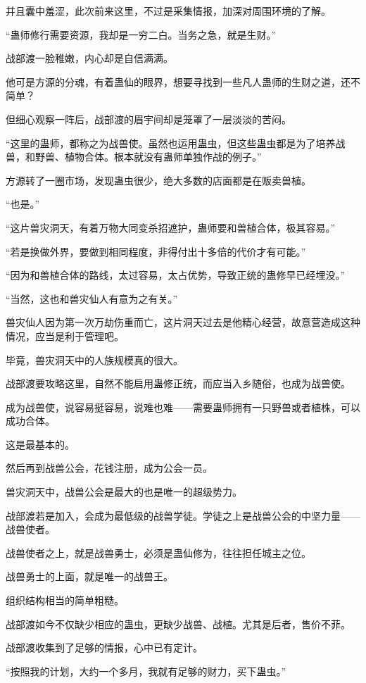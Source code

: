 \begin{this_body}
并且囊中羞涩，此次前来这里，不过是采集情报，加深对周围环境的了解。

“蛊师修行需要资源，我却是一穷二白。当务之急，就是生财。”

战部渡一脸稚嫩，内心却是自信满满。

他可是方源的分魂，有着蛊仙的眼界，想要寻找到一些凡人蛊师的生财之道，还不简单？

但细心观察一阵后，战部渡的眉宇间却是笼罩了一层淡淡的苦闷。

“这里的蛊师，都称之为战兽使。虽然也运用蛊虫，但这些蛊虫都是为了培养战兽，和野兽、植物合体。根本就没有蛊师单独作战的例子。”

方源转了一圈市场，发现蛊虫很少，绝大多数的店面都是在贩卖兽植。

“也是。”

“这片兽灾洞天，有着万物大同变杀招遮护，蛊师要和兽植合体，极其容易。”

“若是换做外界，要做到相同程度，非得付出十多倍的代价才有可能。”

“因为和兽植合体的路线，太过容易，太占优势，导致正统的蛊修早已经埋没。”

“当然，这也和兽灾仙人有意为之有关。”

兽灾仙人因为第一次万劫伤重而亡，这片洞天过去是他精心经营，故意营造成这种情况，应当是利于管理吧。

毕竟，兽灾洞天中的人族规模真的很大。

战部渡要攻略这里，自然不能启用蛊修正统，而应当入乡随俗，也成为战兽使。

成为战兽使，说容易挺容易，说难也难——需要蛊师拥有一只野兽或者植株，可以成功合体。

这是最基本的。

然后再到战兽公会，花钱注册，成为公会一员。

兽灾洞天中，战兽公会是最大的也是唯一的超级势力。

战部渡若是加入，会成为最低级的战兽学徒。学徒之上是战兽公会的中坚力量——战兽使者。

战兽使者之上，就是战兽勇士，必须是蛊仙修为，往往担任城主之位。

战兽勇士的上面，就是唯一的战兽王。

组织结构相当的简单粗糙。

战部渡如今不仅缺少相应的蛊虫，更缺少战兽、战植。尤其是后者，售价不菲。

战部渡收集到了足够的情报，心中已有定计。

“按照我的计划，大约一个多月，我就有足够的财力，买下蛊虫。”


\end{this_body}

